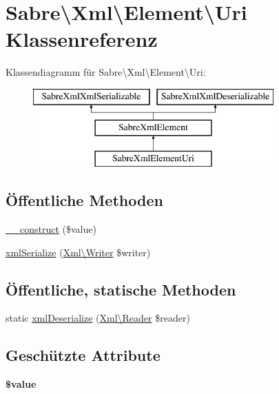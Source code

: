 \hypertarget{class_sabre_1_1_xml_1_1_element_1_1_uri}{}\section{Sabre\textbackslash{}Xml\textbackslash{}Element\textbackslash{}Uri Klassenreferenz}
\label{class_sabre_1_1_xml_1_1_element_1_1_uri}
Klassendiagramm für Sabre\textbackslash{}Xml\textbackslash{}Element\textbackslash{}Uri\+:\begin{figure}[H]
\begin{center}
\leavevmode
\includegraphics[height=3.000000cm]{class_sabre_1_1_xml_1_1_element_1_1_uri}
\end{center}
\end{figure}
\subsection*{Öffentliche Methoden}
\begin{DoxyCompactItemize}
\item 
\mbox{\hyperlink{class_sabre_1_1_xml_1_1_element_1_1_uri_ae222f389b3b482f203c1c751a6a42fde}{\+\_\+\+\_\+construct}} (\$value)
\item 
\mbox{\hyperlink{class_sabre_1_1_xml_1_1_element_1_1_uri_a8a263d4d494ebf339ef91187426af679}{xml\+Serialize}} (\mbox{\hyperlink{class_sabre_1_1_xml_1_1_writer}{Xml\textbackslash{}\+Writer}} \$writer)
\end{DoxyCompactItemize}
\subsection*{Öffentliche, statische Methoden}
\begin{DoxyCompactItemize}
\item 
static \mbox{\hyperlink{class_sabre_1_1_xml_1_1_element_1_1_uri_a651200284a4c3793ce568555720bfc77}{xml\+Deserialize}} (\mbox{\hyperlink{class_sabre_1_1_xml_1_1_reader}{Xml\textbackslash{}\+Reader}} \$reader)
\end{DoxyCompactItemize}
\subsection*{Geschützte Attribute}
\begin{DoxyCompactItemize}
\item 
\mbox{\label{class_sabre_1_1_xml_1_1_element_1_1_uri_aa3afaccb40888a5f79856efc8590710a}} 
{\bfseries \$value}
\end{DoxyCompactItemize}


